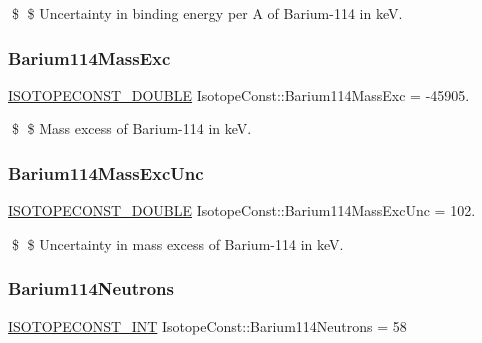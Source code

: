\$ \$ Uncertainty in binding energy per A of Barium-\/114 in keV. \mbox{\label{group___isotope_const-_barium-_ba114_gadb424b175442ad4303584281b01241b1}} 
\subsubsection{\texorpdfstring{Barium114\+Mass\+Exc}{Barium114MassExc}}
{\footnotesize\ttfamily \mbox{\hyperlink{group___isotope_const-_macros_ga8f45a7272ce02c0b4c65c44636ed719a}{I\+S\+O\+T\+O\+P\+E\+C\+O\+N\+S\+T\+\_\+\+D\+O\+U\+B\+LE}} Isotope\+Const\+::\+Barium114\+Mass\+Exc = -\/45905.}

\$ \$ Mass excess of Barium-\/114 in keV. \mbox{\label{group___isotope_const-_barium-_ba114_gac017ee1e69bc46c9c6d596d16c590be5}} 
\subsubsection{\texorpdfstring{Barium114\+Mass\+Exc\+Unc}{Barium114MassExcUnc}}
{\footnotesize\ttfamily \mbox{\hyperlink{group___isotope_const-_macros_ga8f45a7272ce02c0b4c65c44636ed719a}{I\+S\+O\+T\+O\+P\+E\+C\+O\+N\+S\+T\+\_\+\+D\+O\+U\+B\+LE}} Isotope\+Const\+::\+Barium114\+Mass\+Exc\+Unc = 102.}

\$ \$ Uncertainty in mass excess of Barium-\/114 in keV. \mbox{\label{group___isotope_const-_barium-_ba114_ga31cc93361b04442d69d8ddabb2f16b36}} 
\subsubsection{\texorpdfstring{Barium114\+Neutrons}{Barium114Neutrons}}
{\footnotesize\ttfamily \mbox{\hyperlink{group___isotope_const-_macros_ga5f18360b3e99483a35c32d789e62621c}{I\+S\+O\+T\+O\+P\+E\+C\+O\+N\+S\+T\+\_\+\+I\+NT}} Isotope\+Const\+::\+Barium114\+Neutrons = 58}

